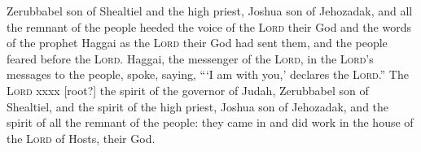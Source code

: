 \begin{inparaenum}
    
    
    
    \bigskip%
    
     Zerubbabel son of Shealtiel and the high priest, Joshua son of Jehozadak, and all the remnant of the people heeded the voice of the \textsc{Lord} their God and the words of the prophet Haggai as the \textsc{Lord} their God had sent them, and the people feared before the \textsc{Lord}.%
     Haggai, the messenger of the \textsc{Lord}, in the \textsc{Lord}'s messages to the people, spoke, saying,\hspace*{4em} ``\thinspace`I am with you,' declares the \textsc{Lord}.''%
     The \textsc{Lord} xxxx [root?] the spirit of the governor of Judah, Zerubbabel son of Shealtiel, and the spirit of the high priest, Joshua son of Jehozadak, and the spirit of all the remnant of the people: they came in and did work in the house of the \textsc{Lord} of Hosts, their God.%
    
\end{inparaenum}
